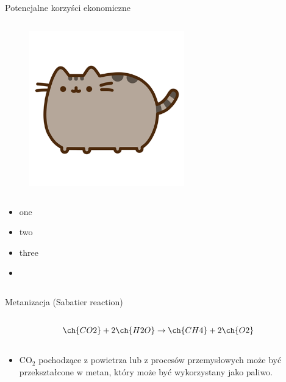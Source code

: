 \begin{columnframe}{Potencjalne korzyści ekonomiczne}
    \begin{column}{0.5\textwidth}
        \begin{figure}
            \centering
            \includegraphics[width=0.6\textwidth, frame]{images/pusheen.png}
        \end{figure}
    \end{column}
    \begin{column}{0.5\textwidth}
        \begin{itemize}
            \item one \keV
            \item two \MeV
            \item three \GeV
            \item \aegis
        \end{itemize}
    \end{column}
\end{columnframe}

\begin{columnframe}{Metanizacja (Sabatier reaction)}
    \begin{column}{0.5\textwidth}
        \[
            \ch{CO2} + 2\ch{H2O} \rightarrow \ch{CH4} + 2\ch{O2}
        \]
    \end{column}
    \begin{column}{0.5\textwidth}
        \begin{itemize}
            \item CO$_2$ pochodzące z powietrza lub z procesów przemysłowych może być przekształcone w metan, który może być wykorzystany jako paliwo.
        \end{itemize}
    \end{column}
\end{columnframe}

